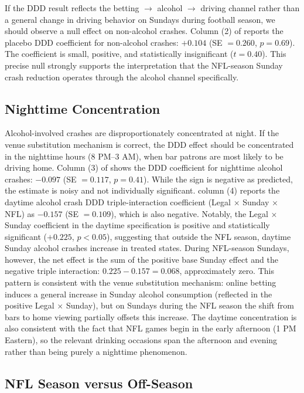 \documentclass[12pt]{article}
\begin{document}
If the DDD result reflects the betting $\rightarrow$ alcohol $\rightarrow$ driving channel rather than a general change in driving behavior on Sundays during football season, we should observe a null effect on non-alcohol crashes. Column (2) of  reports the placebo DDD coefficient for non-alcohol crashes: $+0.104$ (SE $= 0.260$, $p = 0.69$). The coefficient is small, positive, and statistically insignificant ($t = 0.40$). This precise null strongly supports the interpretation that the NFL-season Sunday crash reduction operates through the alcohol channel specifically.

\subsection{Nighttime Concentration}

Alcohol-involved crashes are disproportionately concentrated at night. If the venue substitution mechanism is correct, the DDD effect should be concentrated in the nighttime hours (8 PM--3 AM), when bar patrons are most likely to be driving home. Column (3) of  shows the DDD coefficient for nighttime alcohol crashes: $-0.097$ (SE $= 0.117$, $p = 0.41$). While the sign is negative as predicted, the estimate is noisy and not individually significant.  column (4) reports the daytime alcohol crash DDD triple-interaction coefficient (Legal $\times$ Sunday $\times$ NFL) as $-0.157$ (SE $= 0.109$), which is also negative. Notably, the Legal $\times$ Sunday coefficient in the daytime specification is positive and statistically significant ($+0.225$, $p < 0.05$), suggesting that outside the NFL season, daytime Sunday alcohol crashes increase in treated states. During NFL-season Sundays, however, the net effect is the sum of the positive base Sunday effect and the negative triple interaction: $0.225 - 0.157 = 0.068$, approximately zero. This pattern is consistent with the venue substitution mechanism: online betting induces a general increase in Sunday alcohol consumption (reflected in the positive Legal $\times$ Sunday), but on Sundays during the NFL season the shift from bars to home viewing partially offsets this increase. The daytime concentration is also consistent with the fact that NFL games begin in the early afternoon (1 PM Eastern), so the relevant drinking occasions span the afternoon and evening rather than being purely a nighttime phenomenon.

\subsection{NFL Season versus Off-Season}
\end{document}
